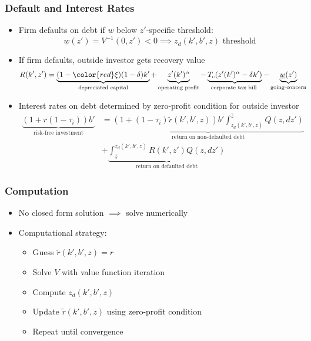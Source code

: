 \documentclass[usenames,dvipsnames, handout]{beamer}
\begin{document}
\begin{frame}
\frametitle{Default and Interest Rates}
\small
\begin{itemize}
\item Firm defaults on debt if $w$ below $z'$-specific threshold:
$$
\underline{w}(z') = V^{-1}(0, z') < 0 \implies z_d(k', b', z) \text{ threshold}
$$
\item If firm defaults, outside investor gets recovery value
\begin{align*}
R(k', z') &= \underbrace{(1-{\color{red}\xi}) (1-\delta)k'}_{\text{depreciated capital}} + \underbrace{z'(k')^\alpha}_{\text{operating profit}} - \underbrace{T_c(z'(k')^\alpha - \delta k')}_{\text{corporate tax bill }} - \underbrace{\underline w (z')}_{\text{going-concern}}
\end{align*}
\item Interest rates on debt determined by zero-profit condition for outside investor
\begin{align*}
\underbrace{(1+r(1-\tau_i))b'}_{\text{risk-free investment}} 
&=
\underbrace{(1+(1-\tau_i)\tilde r(k', b', z))b' \int_{z_d(k', b', z)}^{\bar z} Q(z,dz')}_{\text{return on non-defaulted debt}} \\
&+ \underbrace{\int_{\underline z}^{z_d (k', b', z)} R(k', z') Q(z, dz')}_{\text{return on defaulted debt}}
\end{align*}
\end{itemize}
\end{frame}


\begin{frame}
\frametitle{Computation}
\small
\begin{itemize}
\item No closed form solution $\implies$ solve numerically
\bigskip
\item Computational strategy:
\begin{itemize}
\item Guess $\tilde r (k', b', z) = r$
\item Solve $V$ with value function iteration
\item Compute $z_d(k', b', z)$
\item Update $\tilde r(k', b', z)$ using zero-profit condition
\item Repeat until convergence
\end{itemize}
\end{itemize}
\end{frame}
\end{document}

